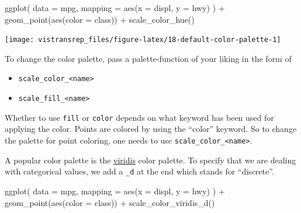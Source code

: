 \documentclass[]{book}
\newenvironment{Shaded}{}{}
\newcommand{\DataTypeTok}[1]{#1}
\newcommand{\KeywordTok}[1]{\textcolor[rgb]{0.00,0.00,1.00}{#1}}
\newcommand{\NormalTok}[1]{#1}
\newcommand{\OperatorTok}[1]{#1}
\newcommand{\StringTok}[1]{\textcolor[rgb]{0.00,0.50,0.50}{#1}}
\providecommand{\tightlist}{%
  \setlength{\itemsep}{0pt}\setlength{\parskip}{0pt}}
\begin{document}
\begin{Shaded}
\begin{Highlighting}[]
\KeywordTok{ggplot}\NormalTok{(}
  \DataTypeTok{data =}\NormalTok{ mpg,}
  \DataTypeTok{mapping =} \KeywordTok{aes}\NormalTok{(}\DataTypeTok{x =}\NormalTok{ displ, }\DataTypeTok{y =}\NormalTok{ hwy)}
\NormalTok{) }\OperatorTok{+}
\StringTok{  }\KeywordTok{geom_point}\NormalTok{(}\KeywordTok{aes}\NormalTok{(}\DataTypeTok{color =}\NormalTok{ class)) }\OperatorTok{+}
\StringTok{  }\KeywordTok{scale_color_hue}\NormalTok{()}
\end{Highlighting}
\end{Shaded}

\begin{flushright}\texttt{[image: vistransrep\_files/figure-latex/18-default-color-palette-1]} \end{flushright}

To change the color palette, pass a palette-function of your liking in the form of

\begin{itemize}
\tightlist
\item
  \texttt{scale\_color\_\textless{}name\textgreater{}}
\item
  \texttt{scale\_fill\_\textless{}name\textgreater{}}
\end{itemize}

Whether to use \texttt{fill} or \texttt{color} depends on what keyword has been used for applying the color.
Points are colored by using the ``color'' keyword.
So to change the palette for point coloring, one needs to use \texttt{scale\_color\_\textless{}name\textgreater{}}.

A popular color palette is the \href{https://cran.r-project.org/web/packages/viridis/vignettes/intro-to-viridis.html\#gallery}{viridis} color palette.
To specify that we are dealing with categorical values, we add a \texttt{\_d} at the end which stands for ``discrete''.

\begin{Shaded}
\begin{Highlighting}[]
\KeywordTok{ggplot}\NormalTok{(}
  \DataTypeTok{data =}\NormalTok{ mpg,}
  \DataTypeTok{mapping =} \KeywordTok{aes}\NormalTok{(}\DataTypeTok{x =}\NormalTok{ displ, }\DataTypeTok{y =}\NormalTok{ hwy)}
\NormalTok{) }\OperatorTok{+}
\StringTok{  }\KeywordTok{geom_point}\NormalTok{(}\KeywordTok{aes}\NormalTok{(}\DataTypeTok{color =}\NormalTok{ class)) }\OperatorTok{+}
\StringTok{  }\KeywordTok{scale_color_viridis_d}\NormalTok{()}
\end{Highlighting}
\end{Shaded}
\end{document}
